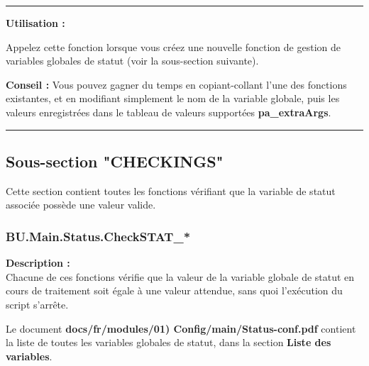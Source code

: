 \documentclass[a4paper,10pt]{article}
\begin{document}
\setlength{\parskip}{1em}


\par\noindent\rule{\textwidth}{0.4pt}

\begin{justify}
    \textbf{Utilisation :}

    Appelez cette fonction lorsque vous créez une nouvelle fonction de gestion de variables globales de statut (voir la sous-section suivante).
\end{justify}

\begin{justify}
    \textbf{Conseil :} Vous pouvez gagner du temps en copiant-collant l'une des fonctions existantes, et en modifiant simplement le nom de la variable globale, puis les valeurs enregistrées dans le tableau de valeurs supportées \textbf{\color{vars}pa\_extraArgs}.
\end{justify}



\color{sec2}\par\noindent\rule{\textwidth}{0.4pt}\color{text}

\color{sec2}
\subsection{Sous-section "CHECKINGS"}\color{text}

\begin{justify}
    Cette section contient toutes les fonctions vérifiant que la variable de statut associée possède une valeur valide.
\end{justify}

\color{sec3}
\subsubsection{BU.Main.Status.CheckSTAT\_*}\color{text}

\begin{justify}
    \textbf{Description :}\\[1\baselineskip]
    Chacune de ces fonctions vérifie que la valeur de la variable globale de statut en cours de traitement soit égale à une valeur attendue, sans quoi l'exécution du script s'arrête.
\end{justify}

\begin{justify}
     Le document \textbf{\color{path}docs/fr/modules/01) Config/main/Status-conf.pdf} contient la liste de toutes les variables globales de statut, dans la section \textbf{\color{sec1}Liste des variables}.
\end{justify}\setlength{\parskip}{1em}
\end{document}
